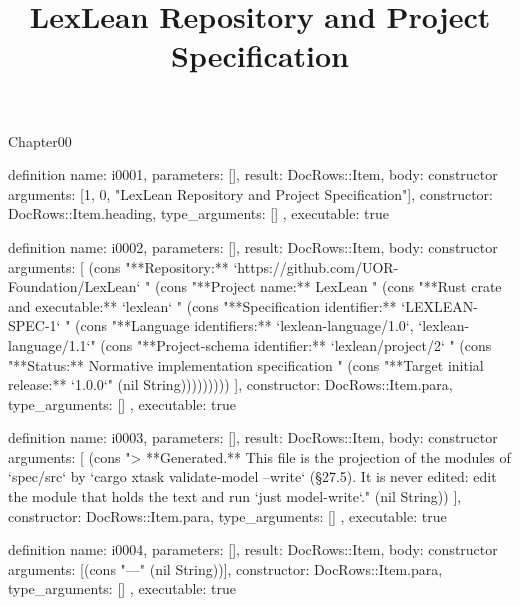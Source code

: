 \begin{lexlean}{Chapter00}
\title{LexLean Repository and Project Specification}
\begin{semanticmodule}
definition{
  name: i0001,
  parameters: [],
  result: DocRows::Item,
  body: constructor{
    arguments: [1, 0, "LexLean Repository and Project Specification"],
    constructor: DocRows::Item.heading,
    type_arguments: []
  },
  executable: true
}

definition{
  name: i0002,
  parameters: [],
  result: DocRows::Item,
  body: constructor{
    arguments: [
      (cons "**Repository:** `https://github.com/UOR-Foundation/LexLean`  " (cons "**Project name:** LexLean  " (cons "**Rust crate and executable:** `lexlean`  " (cons "**Specification identifier:** `LEXLEAN-SPEC-1`  " (cons "**Language identifiers:** `lexlean-language/1.0`, `lexlean-language/1.1`" (cons "**Project-schema identifier:** `lexlean/project/2`  " (cons "**Status:** Normative implementation specification  " (cons "**Target initial release:** `1.0.0`" (nil String)))))))))
    ],
    constructor: DocRows::Item.para,
    type_arguments: []
  },
  executable: true
}

definition{
  name: i0003,
  parameters: [],
  result: DocRows::Item,
  body: constructor{
    arguments: [
      (cons "> **Generated.** This file is the projection of the modules of `spec/src` by `cargo xtask validate-model --write` (§27.5). It is never edited: edit the module that holds the text and run `just model-write`." (nil String))
    ],
    constructor: DocRows::Item.para,
    type_arguments: []
  },
  executable: true
}

definition{
  name: i0004,
  parameters: [],
  result: DocRows::Item,
  body: constructor{
    arguments: [(cons "---" (nil String))],
    constructor: DocRows::Item.para,
    type_arguments: []
  },
  executable: true
}
\end{semanticmodule}
\end{lexlean}
